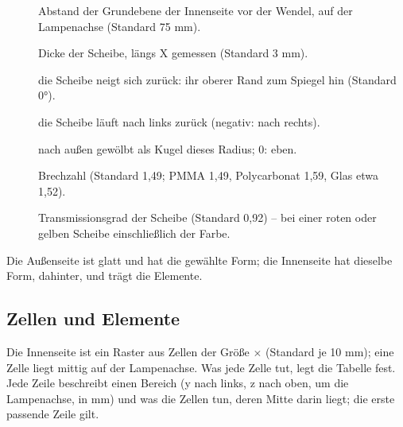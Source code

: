\begin{description}
  \item[] Abstand der Grundebene der Innenseite vor der Wendel,
    auf der Lampenachse (Standard 75 mm).
  \item[] Dicke der Scheibe, längs X gemessen (Standard 3 mm).
  \item[] die Scheibe neigt sich zurück: ihr oberer Rand zum Spiegel hin (Standard
    \ang{0}).
  \item[] die Scheibe läuft nach links zurück (negativ: nach rechts).
  \item[] nach außen gewölbt als Kugel dieses Radius; 0: eben.
  \item[] Brechzahl (Standard 1,49; PMMA 1,49, Polycarbonat 1,59, Glas etwa
    1,52).
  \item[] Transmissionsgrad der Scheibe (Standard 0,92) -- bei einer roten oder
    gelben Scheibe einschließlich der Farbe.
\end{description}

Die Außenseite ist glatt und hat die gewählte Form; die Innenseite hat dieselbe Form, 
dahinter, und trägt die Elemente.

\subsection{Zellen und Elemente}\label{sec:al-elemente}

Die Innenseite ist ein Raster aus Zellen der Größe  $\times$ 
(Standard je 10 mm); eine Zelle liegt mittig auf der Lampenachse. Was jede Zelle tut, legt die
Tabelle  fest. Jede Zeile beschreibt einen Bereich (y nach links, z nach oben, um die
Lampenachse, in mm) und was die Zellen tun, deren Mitte darin liegt; die erste passende Zeile gilt.

